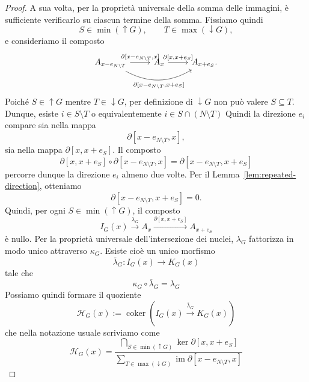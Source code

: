 \documentclass[a4paper]{article}
\DeclareMathOperator{\im}{im}
\begin{document}
\begin{proof}
    A sua volta, per la proprietà universale della somma delle immagini, è
    sufficiente verificarlo su ciascun termine della somma. Fissiamo quindi
    \[
        S\in\min(\uparrow G),
        \qquad
        T\in\max(\downarrow G),
    \]
    e consideriamo il composto
    \[
        \begin{tikzcd}
            A_{x-e_{N\setminus T}}
            \arrow[r, "{\partial[x-e_{N\setminus T},x]}"]
            \arrow[rr, "{\partial[x-e_{N\setminus T},x+e_S]}"', bend right]
            &
            A_x
            \arrow[r, "{\partial[x,x+e_S]}"]
            &
            A_{x+e_S}.
        \end{tikzcd}
    \]
    Poiché \(S\in\uparrow G\) mentre \(T\in\downarrow G\), per definizione di
    \(\downarrow G\) non può valere \(S\subseteq T\). Dunque, esiste
    \(i\in S\setminus T\) o equivalentemente \(i\in S\cap (N\setminus T)\)
    Quindi la direzione \(e_i\) compare sia nella mappa
    \[
        \partial[x-e_{N\setminus T},x],
    \]
    sia nella mappa \(\partial[x,x+e_S]\).
    Il composto
    \[
        \partial[x,x+e_S]
        \circ
        \partial[x-e_{N\setminus T},x]
        =
        \partial[x-e_{N\setminus T},x+e_S]
    \]
    percorre dunque la direzione \(e_i\) almeno due volte. Per il Lemma~\ref{lem:repeated-direction}, otteniamo
    \[
        \partial[x-e_{N\setminus T},x+e_S]=0.
    \]
    Quindi, per ogni \(S\in\min(\uparrow G)\), il composto
    \[
        I_G(x)
        \xrightarrow{\lambda_G}
        A_x
        \xrightarrow{\partial[x,x+e_S]}
        A_{x+e_S}
    \]
    è nullo. Per la proprietà universale dell'intersezione dei nuclei,
    \(\lambda_G\) fattorizza in modo unico attraverso \(\kappa_G\). Esiste cioè
    un unico morfismo
    \[
        \overline{\lambda}_G\colon I_G(x)\to K_G(x)
    \]
    tale che
    \[
        \kappa_G\circ \overline{\lambda}_G = \lambda_G
    \]
    Possiamo quindi formare il quoziente
    \[
        \mathcal H_G(x)
        :=
        \operatorname{coker}
        \left(
            I_G(x)
            \xrightarrow{\overline{\lambda}_G}
            K_G(x)
        \right)
    \]
    che nella notazione usuale scriviamo come
    \[
        \mathcal H_G(x)
        =
        \frac{
            \displaystyle
            \bigcap_{S\in \min(\uparrow G)}
            \ker \partial[x,x+e_S]
        }{
            \displaystyle
            \sum_{T\in \max(\downarrow G)}
            \im \partial[x-e_{N\setminus T},x]
        }
    \]
\end{proof}
\end{document}
